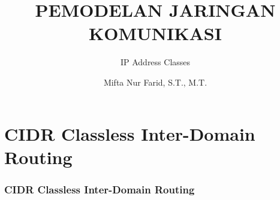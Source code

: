 \documentclass[pdflatex,compress]{beamer}
\title{PEMODELAN JARINGAN KOMUNIKASI}
\subtitle{IP Address Classes}
\author{Mifta Nur Farid, S.T., M.T.}
\begin{document}
\maketitle

\section{CIDR Classless Inter-Domain Routing}

\begin{frame}
	\frametitle{CIDR Classless Inter-Domain Routing}
\end{frame}
\end{document}
